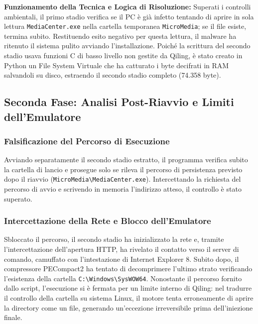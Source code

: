 \documentclass[11pt, a4paper]{article}
\begin{document}
	\textbf{Funzionamento della Tecnica e Logica di Risoluzione:} Superati i controlli ambientali, il primo stadio verifica se il PC è già infetto tentando di aprire in sola lettura \texttt{MediaCenter.exe} nella cartella temporanea \texttt{MicroMedia}; se il file esiste, termina subito. Restituendo esito negativo per questa lettura, il malware ha ritenuto il sistema pulito avviando l'installazione. Poiché la scrittura del secondo stadio usava funzioni C di basso livello non gestite da Qiling, è stato creato in Python un File System Virtuale che ha catturato i byte decifrati in RAM salvandoli su disco, estraendo il secondo stadio completo (74.358 byte).
	
	\subsection{Seconda Fase: Analisi Post-Riavvio e Limiti dell'Emulatore}
	
	\subsubsection{Falsificazione del Percorso di Esecuzione}
	
	Avviando separatamente il secondo stadio estratto, il programma verifica subito la cartella di lancio e prosegue solo se rileva il percorso di persistenza previsto dopo il riavvio (\texttt{MicroMedia\textbackslash MediaCenter.exe}). Intercettando la richiesta del percorso di avvio e scrivendo in memoria l'indirizzo atteso, il controllo è stato superato.
	
	\subsubsection{Intercettazione della Rete e Blocco dell'Emulatore}
	
	Sbloccato il percorso, il secondo stadio ha inizializzato la rete e, tramite l'intercettazione dell'apertura HTTP, ha rivelato il contatto verso il server di comando, camuffato con l'intestazione di Internet Explorer 8. Subito dopo, il compressore PECompact2 ha tentato di decomprimere l'ultimo strato verificando l'esistenza della cartella \texttt{C:\textbackslash Windows\textbackslash SysWOW64}. Nonostante il percorso fornito dallo script, l'esecuzione si è fermata per un limite interno di Qiling: nel tradurre il controllo della cartella su sistema Linux, il motore tenta erroneamente di aprire la directory come un file, generando un'eccezione irreversibile prima dell'iniezione finale.
	
\end{document}
